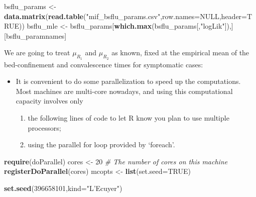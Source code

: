 \documentclass[]{article}
\newenvironment{Shaded}{\begin{snugshade}}{\end{snugshade}}
\newcommand{\KeywordTok}[1]{\textcolor[rgb]{0.13,0.29,0.53}{\textbf{#1}}}
\newcommand{\DataTypeTok}[1]{\textcolor[rgb]{0.13,0.29,0.53}{#1}}
\newcommand{\DecValTok}[1]{\textcolor[rgb]{0.00,0.00,0.81}{#1}}
\newcommand{\StringTok}[1]{\textcolor[rgb]{0.31,0.60,0.02}{#1}}
\newcommand{\CommentTok}[1]{\textcolor[rgb]{0.56,0.35,0.01}{\textit{#1}}}
\newcommand{\OtherTok}[1]{\textcolor[rgb]{0.56,0.35,0.01}{#1}}
\newcommand{\OperatorTok}[1]{\textcolor[rgb]{0.81,0.36,0.00}{\textbf{#1}}}
\newcommand{\NormalTok}[1]{#1}
\begin{document}
\begin{Shaded}
\begin{Highlighting}[]
\NormalTok{bsflu_params <-}\StringTok{ }\KeywordTok{data.matrix}\NormalTok{(}\KeywordTok{read.table}\NormalTok{(}\StringTok{"mif_bsflu_params.csv"}\NormalTok{,}\DataTypeTok{row.names=}\OtherTok{NULL}\NormalTok{,}\DataTypeTok{header=}\OtherTok{TRUE}\NormalTok{))}
\NormalTok{bsflu_mle <-}\StringTok{ }\NormalTok{bsflu_params[}\KeywordTok{which.max}\NormalTok{(bsflu_params[,}\StringTok{"logLik"}\NormalTok{]),][bsflu_paramnames]}
\end{Highlighting}
\end{Shaded}

We are going to treat \(\mu_{R_1}\) and \(\mu_{R_2}\) as known, fixed at
the empirical mean of the bed-confinement and convalescence times for
symptomatic cases:

\begin{Shaded}
\end{Shaded}

\begin{itemize}
\item
  It is convenient to do some parallelization to speed up the
  computations. Most machines are multi-core nowadays, and using this
  computational capacity involves only

  \begin{enumerate}
  \def\labelenumi{\arabic{enumi}.}
  \item
    the following lines of code to let R know you plan to use multiple
    processors;
  \item
    using the parallel for loop provided by `foreach'.
  \end{enumerate}
\end{itemize}

\begin{Shaded}
\begin{Highlighting}[]
\KeywordTok{require}\NormalTok{(doParallel)}
\NormalTok{cores <-}\StringTok{ }\DecValTok{20}  \CommentTok{# The number of cores on this machine }
\KeywordTok{registerDoParallel}\NormalTok{(cores)}
\NormalTok{mcopts <-}\StringTok{ }\KeywordTok{list}\NormalTok{(}\DataTypeTok{set.seed=}\OtherTok{TRUE}\NormalTok{)}

\KeywordTok{set.seed}\NormalTok{(}\DecValTok{396658101}\NormalTok{,}\DataTypeTok{kind=}\StringTok{"L'Ecuyer"}\NormalTok{)}
\end{Highlighting}
\end{Shaded}
\end{document}
